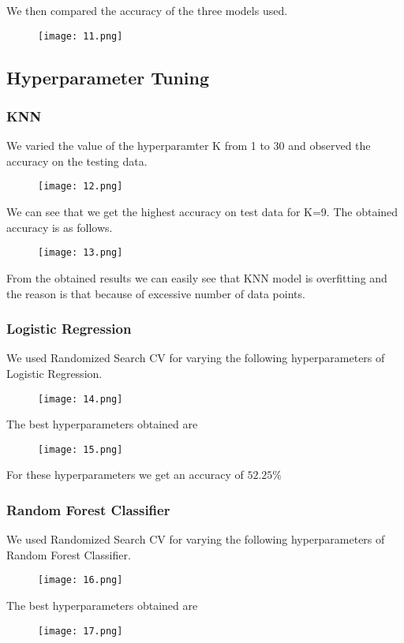 \documentclass[conference]{IEEEtran}
\begin{document}
We then compared the accuracy of the three models used.
\begin{figure}[H]
    \centering
    \texttt{[image: 11.png]}
\end{figure}


\subsection{Hyperparameter Tuning}
\subsubsection{KNN}
We varied the value of the hyperparamter K from 1 to 30 and observed the accuracy on the testing data.
\begin{figure}[H]
    \centering
    \texttt{[image: 12.png]}
\end{figure}

We can see that we get the highest accuracy on test data for K=9. The obtained accuracy is as follows.
\begin{figure}[H]
    \centering
    \texttt{[image: 13.png]}
\end{figure}

From the obtained results we can easily see that KNN model is overfitting and the reason is that because of excessive number of data points.

\subsubsection{Logistic Regression}
We used Randomized Search CV for varying the following hyperparameters of Logistic Regression.
\begin{figure}[H]
    \centering
    \texttt{[image: 14.png]}
\end{figure}
The best hyperparameters obtained are
\begin{figure}[H]
    \centering
    \texttt{[image: 15.png]}
\end{figure}

For these hyperparameters we get an accuracy of $52.25 \%$

\subsubsection{Random Forest Classifier}
We used Randomized Search CV for varying the following hyperparameters of Random Forest Classifier.
\begin{figure}[H]
    \centering
    \texttt{[image: 16.png]}
\end{figure}
The best hyperparameters obtained are
\begin{figure}[H]
    \centering
    \texttt{[image: 17.png]}
\end{figure}
\end{document}
